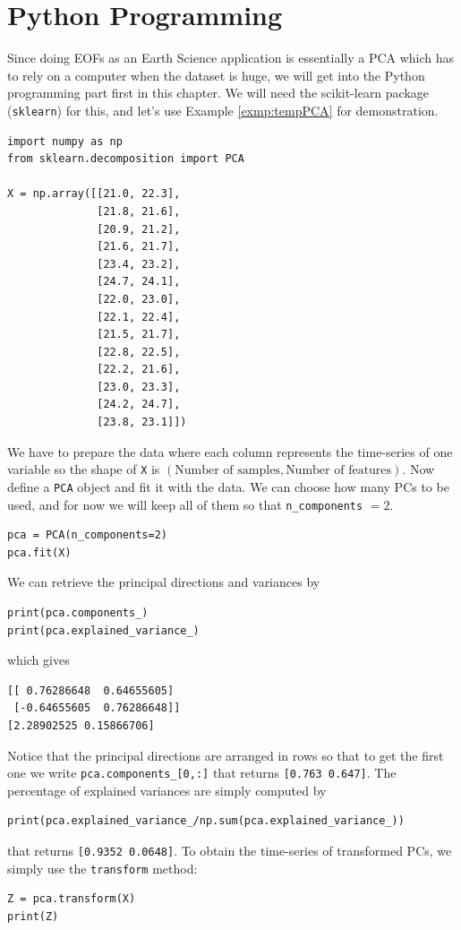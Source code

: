 \section{Python Programming}
Since doing EOFs as an Earth Science application is essentially a PCA which has to rely on a computer when the dataset is huge, we will get into the Python programming part first in this chapter. We will need the scikit-learn package (\texttt{sklearn}) for this, and let's use Example \ref{exmp:tempPCA} for demonstration.
\begin{lstlisting}
import numpy as np
from sklearn.decomposition import PCA    

X = np.array([[21.0, 22.3],
              [21.8, 21.6],
              [20.9, 21.2],
              [21.6, 21.7],
              [23.4, 23.2],
              [24.7, 24.1],
              [22.0, 23.0],
              [22.1, 22.4],
              [21.5, 21.7],
              [22.8, 22.5],
              [22.2, 21.6],
              [23.0, 23.3],
              [24.2, 24.7],
              [23.8, 23.1]])
\end{lstlisting}
We have to prepare the data where each column represents the time-series of one variable so the shape of \verb|X| is $(\text{Number of samples}, \text{Number of features})$. Now define a \verb|PCA| object and fit it with the data. We can choose how many PCs to be used, and for now we will keep all of them so that \verb|n_components| $=2$.
\begin{lstlisting}
pca = PCA(n_components=2)
pca.fit(X)    
\end{lstlisting}
We can retrieve the principal directions and variances by
\begin{lstlisting}
print(pca.components_)
print(pca.explained_variance_)    
\end{lstlisting}
which gives
\begin{lstlisting}
[[ 0.76286648  0.64655605]
 [-0.64655605  0.76286648]]
[2.28902525 0.15866706] 
\end{lstlisting}
Notice that the principal directions are arranged in rows so that to get the first one we write \verb|pca.components_[0,:]| that returns \verb|[0.763 0.647]|. The percentage of explained variances are simply computed by
\begin{lstlisting}
print(pca.explained_variance_/np.sum(pca.explained_variance_))
\end{lstlisting}
that returns \verb|[0.9352 0.0648]|. To obtain the time-series of transformed PCs, we simply use the \verb|transform| method:
\begin{lstlisting}
Z = pca.transform(X)
print(Z)
\end{lstlisting}

